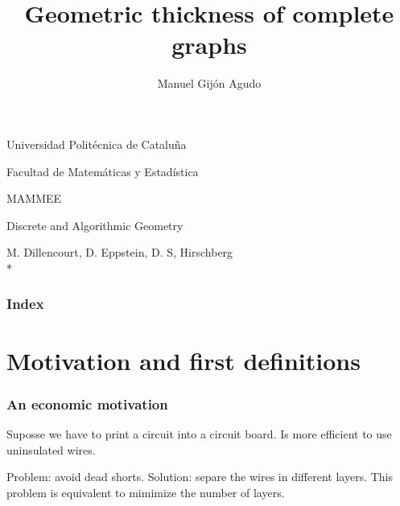 \documentclass[12 pt]{beamer}
\title{Geometric thickness of complete graphs}
\author{\normalsize{Manuel Gijón Agudo}}
\date{}
\begin{document}
\begin{frame}[plain]
    \begin{center}

        Universidad Politécnica de Cataluña
        
        Facultad de Matemáticas y Estadística
        
        MAMMEE
        
        \scriptsize{Discrete and Algorithmic Geometry}
        
        \maketitle    
        M. Dillencourt, D. Eppstein, D. S, Hirschberg\\*
        
        \small{}
    \end{center}
    
    
\end{frame}



\begin{frame}{0}
    \frametitle{Index}
     
    \tableofcontents  
\end{frame}

\section{Motivation and first definitions}

\begin{frame}{1}
    \frametitle{An economic motivation}
    Suposse we have to print a circuit into a circuit board. Is more efficient to use uninsulated wires.
    
  
    
    Problem: avoid dead shorts. Solution: separe the wires in different layers.
    This problem is equivalent to mimimize the number of layers.
    
\end{frame}
\end{document}
